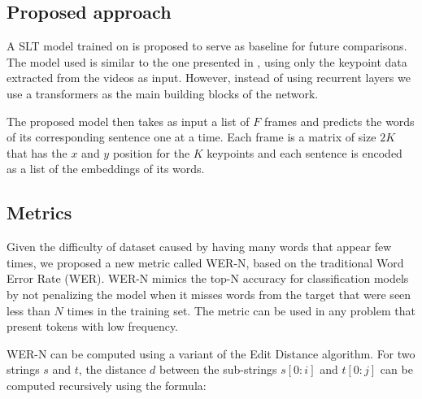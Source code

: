 \subsection{Proposed approach}

A SLT model trained on \dbname is proposed to serve as baseline for future comparisons. The model used is similar to the one presented in \cite{kim2022keypoint}, using only the keypoint data extracted from the videos as input. However, instead of using recurrent layers we use a transformers as the main building blocks of the network.


The proposed model then takes as input a list of \(F\) frames and predicts the words of its corresponding sentence one at a time. Each frame is a matrix of size \(2K\) that has the \(x\) and \(y\) position for the \(K\) keypoints and each sentence is encoded as a list of the embeddings of its words.

\subsection{Metrics}

Given the difficulty of \dbname dataset caused by having many words that appear few times, we proposed a new metric called WER-N, based on the traditional Word Error Rate (WER). WER-N mimics the top-N accuracy for classification models by not penalizing the model when it misses words from the target that were seen less than \(N\) times in the training set. The metric can be used in any problem that present tokens with low frequency.

WER-N can be computed using a variant of the Edit Distance algorithm. For two strings \(s\) and \(t\), the distance \(d\) between the sub-strings \(s[0:i]\) and \(t[0:j]\) can be computed recursively using the formula:

